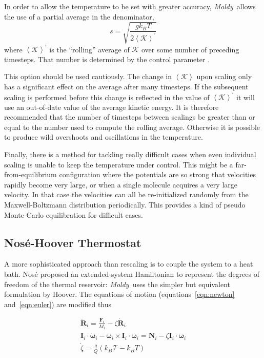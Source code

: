 \documentclass[a4paper,twoside]{report}
\newcommand{\bm}[1]{\mathbf{#1}}
\newcommand{\moldy}{\emph{Moldy}}
\begin{document}
In order to allow the temperature to be set with greater accuracy,
\moldy\ allows the use of a partial average in the denominator,
\begin{equation}
\label{eqn:rav-scaling}
s = \sqrt{\frac{gk_BT}{2\left < {\mathcal  K}\right >^\prime}}
\end{equation}
where $\left < {\mathcal K}\right >^\prime$ is the ``rolling'' average of
$\mathcal K$ over some number of preceding timesteps.  That number is
determined by the control parameter .   

This option should be used cautiously.  The change in $\left <{\mathcal
K}\right >$ upon scaling only has a significant effect on the average
after many timesteps. If the subsequent scaling is performed before
this change is reflected in the value of $\left < {\mathcal K}\right
>^\prime$ it will use an out-of-date value of the average kinetic
energy.  It is therefore recommended that the number of timesteps
between scalings be greater than or equal to the number used to
compute the rolling average.  Otherwise it is possible to produce wild
overshoots and oscillations in the temperature.

Finally, there is a method for tackling really difficult cases when
even individual scaling is unable to keep the temperature under
control.  This might be a far-from-equilibrium configuration where the
potentials are so strong that velocities rapidly become very large,
or when a single molecule acquires a very large velocity.  In that
case the velocities can all be re-initialized randomly from the
Maxwell-Boltzmann distribution periodically.  This provides a kind of
pseudo Monte-Carlo equilibration for difficult cases.

\subsection{Nos\'e-Hoover Thermostat}
\label{sec:const-temp}
A more sophisticated approach than rescaling is to couple the system
to a heat bath.  Nos\'e\cite{nose:84} proposed an extended-system
Hamiltonian to represent the degrees of freedom of the thermal
reservoir: \moldy\ uses the simpler but equivalent formulation by
Hoover\cite{hoover:85,allen:87}.  The equations of
motion (equations~\ref{eqn:newton} and~\ref{eqn:euler}) are modified thus

\begin{eqnarray}
\label{eqn:nhtherm}
\ddot{\bm{R}}_i = \frac{\bm{F}_i}{M_i} - \zeta \dot{\bm{R}}_i
\nonumber \\
\bm{I}_i \cdot \dot{\bm\omega}_i - \bm\omega_i \times \bm{I}_i
\cdot
\bm\omega_i = \bm{N}_i - \zeta \bm{I}_i \cdot \bm\omega_i \\
\dot{\zeta} = \frac{g}{Q}\left ( k_B {\mathcal T} - k_B T \right )
\nonumber
\end{eqnarray}
\end{document}
